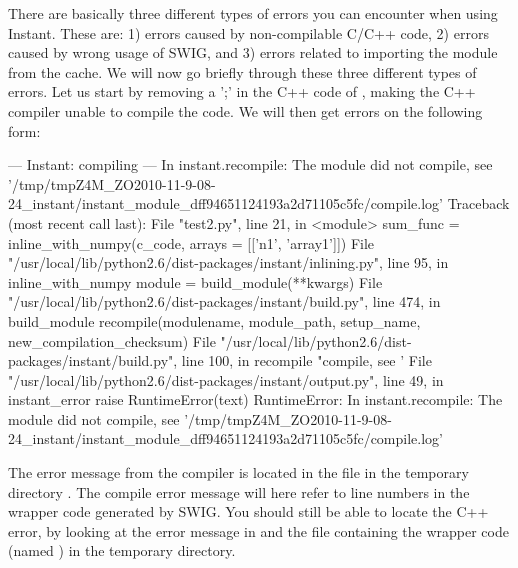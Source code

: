 There are basically three different types of errors you can encounter when using Instant. 
These are: 1) errors caused by non-compilable C/C++ code, 2) errors caused by wrong usage of SWIG, 
and 3) errors related to importing the module from the cache. We will now go briefly through 
these three different types of errors. Let us start by removing a ';' in the C++ code of
, making the C++ compiler unable to compile the code. We will then get errors on the 
following form: 
\begin{python}
--- Instant: compiling ---
In instant.recompile: The module did not compile, 
   see '/tmp/tmpZ4M_ZO2010-11-9-08-24_instant/instant_module_dff94651124193a2d71105c5fc/compile.log'
Traceback (most recent call last):
      File "test2.py", line 21, in <module>
          sum_func = inline_with_numpy(c_code, arrays = [['n1', 'array1']])
        File "/usr/local/lib/python2.6/dist-packages/instant/inlining.py", line 95, in inline_with_numpy
          module = build_module(**kwargs)
        File "/usr/local/lib/python2.6/dist-packages/instant/build.py", line 474, in build_module
          recompile(modulename, module_path, setup_name, new_compilation_checksum)
        File "/usr/local/lib/python2.6/dist-packages/instant/build.py", line 100, in recompile
          "compile, see '%
        File "/usr/local/lib/python2.6/dist-packages/instant/output.py", line 49, in instant_error
          raise RuntimeError(text)
      RuntimeError: In instant.recompile: The module did not compile, 
      see '/tmp/tmpZ4M_ZO2010-11-9-08-24_instant/instant_module_dff94651124193a2d71105c5fc/compile.log'
\end{python}
The error message from the compiler is located in the file  in the temporary directory 
.
The compile error message will here refer to line numbers in the wrapper code generated by SWIG. 
You should still be able to locate the C++ error, by looking at the error message in 
and the file containing the wrapper code (named ) in the temporary directory.

